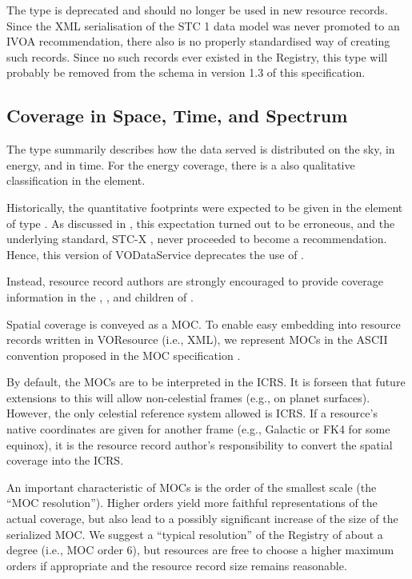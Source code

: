 \documentclass[11pt,a4paper]{ivoa}
\begin{document}
The  type is deprecated and should no longer be
used in new resource records.  Since the XML serialisation of the STC 1
data model was never promoted to an IVOA recommendation, there also is
no properly standardised way of creating such records.  Since no such
records ever existed in the Registry, this type will probably be removed
from the schema in version 1.3 of this specification.



\subsection{Coverage in Space, Time, and Spectrum}
\label{sect:cover}

The  type summarily describes how the data served is
distributed on the
sky, in energy, and in time.  For the energy coverage, there is a
also qualitative classification in the   element.

Historically, the quantitative footprints were expected to be given in
the element of type .  As discussed in
\citet{note:regstc}, this expectation turned out to be erroneous,
and the underlying standard, STC-X \citep{note:stcx}, never proceeded to become
a recommendation.  Hence, this version of VODataService deprecates the
use of .

Instead, resource record authors are strongly encouraged to provide
coverage information in the , , and
 children of .

Spatial coverage is conveyed as a MOC.  To enable easy embedding into
resource records written in VOResource (i.e., XML), 
we represent MOCs in the ASCII convention
proposed in the MOC specification \citep{2014ivoa.spec.0602F}.

By default, the MOCs are to be interpreted in the ICRS.  It is forseen
that future extensions  to this will allow non-celestial frames (e.g., on planet
surfaces).  However, the only celestial reference system allowed is
ICRS.  If a resource's native coordinates are given for another frame (e.g.,
Galactic or FK4 for some equinox), it is the resource record author's
responsibility to convert the spatial coverage into the ICRS.

An important characteristic of MOCs is the order of the smallest scale
(the ``MOC resolution'').  Higher orders yield more faithful
representations of the actual coverage, but also lead to a possibly
significant increase of the size of the serialized MOC.  We suggest a
``typical resolution'' of the Registry of about a degree (i.e., MOC
order 6), but resources are free to choose a higher maximum orders if
appropriate and the resource record size remains reasonable.
\end{document}
